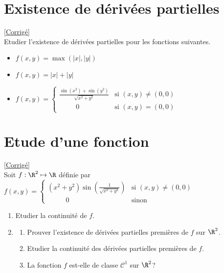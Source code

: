 \documentclass{book}
\begin{document}
\section{Existence de dérivées partielles}
\label{Existence de dérivées partielles}
\textcolor{blue}{\hyperref[Existence de dérivées partielles corrigé]{[Corrigé]}}\\
Etudier l'existence de dérivées partielles pour les fonctions suivantes.
\begin{itemize}
	\item $f(x,y)=\max(|x|,|y|)$
	\item $f(x,y)=|x|+|y|$
	\item $f(x,y)=\begin{cases}
		\displaystyle\frac{\sin(x^2)+\sin(y^2)}{\sqrt{x^2+y^2}}&\mbox{si }(x,y)\ne(0,0)\\
		\ \ \ \ \ \ \ \ \ \ \ 0&\mbox{si } (x,y)=(0,0)
	\end{cases}$
\end{itemize}

\section{Etude d'une fonction}
\label{Etude d'une fonction}
\textcolor{blue}{\hyperref[Etude d'une fonction corrigé]{[Corrigé]}}\\
Soit $f:\R^2\mapsto\R$ définie par $f(x,y)=\begin{cases}(x^2+y^2)\displaystyle\sin\left(\frac{1}{\sqrt{x^2+y^2}}\right) &\text{si } (x,y)\ne(0,0) \\ \ \ \ \ \ \ \ \ \ \ \ \ 0 & \text{sinon}\end{cases}$
\begin{enumerate}
	\item Etudier la continuité de $f$.
	\item \begin{enumerate}
		\item Prouver l'existence de dérivées partielles premières de $f$ sur $\R^2$.
		\item Etudier la continuité des dérivées partielles premières de $f$.
		\item La fonction $f$ est-elle de classe $\mathcal C^1$ sur $\R^2$? 
	\end{enumerate}
\end{enumerate}
\end{document}
